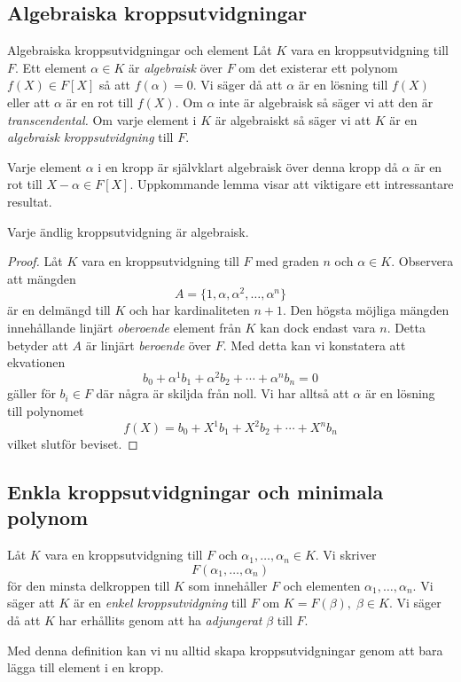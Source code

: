 \documentclass{article}
\theoremstyle{definition}
\begin{document}
\subsection{Algebraiska kroppsutvidgningar}
\begin{mydef}{Algebraiska kroppsutvidgningar och element}{}
  Låt $K$ vara en kroppsutvidgning till $F$. Ett element $\alpha \in K$ är \textit{algebraisk} över $F$ om det existerar ett polynom $f(X) \in F[X]$ 
  så att $f(\alpha) = 0.$ Vi säger då att $\alpha$ är en lösning till $f(X)$ eller att $\alpha$ är en rot till $f(X).$ Om $\alpha$ inte är algebraisk så säger 
  vi att den är \textit{transcendental.}
  Om varje element i $K$ är algebraiskt så säger vi att $K$ är en \textit{algebraisk kroppsutvidgning} till $F$.
\end{mydef}
Varje element $\alpha$ i en kropp är självklart algebraisk över denna kropp då $\alpha$ är en rot till $X - \alpha \in F[X]$. Uppkommande lemma visar att 
viktigare ett intressantare resultat. 

\hypertarget{algebraiskkropp}{}
\begin{mylemma}{}{}
  Varje ändlig kroppsutvidgning är algebraisk.
\end{mylemma}

\begin{proof}
  Låt $K$ vara en kroppsutvidgning till $F$ med graden $n$ och $\alpha \in K$. Observera att mängden
  \[A = \{1, \alpha, \alpha^2, \ldots, \alpha^n\} \]
  är en delmängd till $K$ och har kardinaliteten $n+1$. Den högsta möjliga mängden innehållande linjärt \textit{oberoende} element från $K$ kan dock endast vara $n$. 
  Detta betyder att $A$ är linjärt \textit{beroende} över $F$. Med detta kan vi konstatera att ekvationen
  \[b_0 + \alpha^1 b_1 + \alpha^2 b_2 + \cdots + \alpha^n b_n = 0\]
  gäller för $b_i \in F$ där några är skiljda från noll. Vi har alltså att $\alpha$ är en lösning till polynomet 
  \[f(X) = b_0 + X^1 b_1 + X^2 b_2 + \cdots + X^n b_n\]
  vilket slutför beviset.
\end{proof}

\subsection{Enkla kroppsutvidgningar och minimala polynom}
\begin{mydef}{}{}
  Låt $K$ vara en kroppsutvidgning till $F$ och $\alpha_1, \ldots, \alpha_n \in K$. Vi skriver  
  \[F(\alpha_1, \ldots, \alpha_n)\]
  för den minsta delkroppen till $K$ som innehåller $F$ och elementen $\alpha_1, \ldots, \alpha_n$. Vi säger att $K$ är en \textit{enkel kroppsutvidgning} till $F$
  om $K = F(\beta), \; \beta \in K.$ Vi säger då att $K$ har erhållits genom att ha \textit{adjungerat} $\beta$ till $F$.
\end{mydef}
Med denna definition kan vi nu alltid skapa kroppsutvidgningar genom att bara lägga till element i en kropp. 
\end{document}
